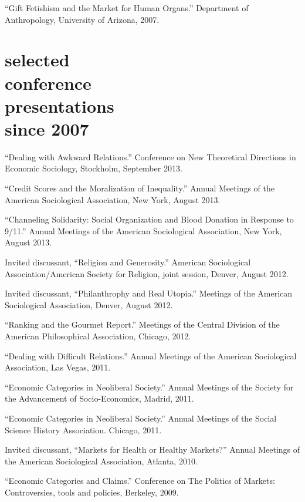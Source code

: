 \documentclass[11pt,oneside,a4paper,DIV=8]{scrartcl}
\begin{document}
``Gift Fetishism and the Market for Human Organs.'' Department of Anthropology, University of Arizona, 2007. 





\section{selected \\ conference \\ presentations \\ since 2007}


``Dealing with Awkward Relations.'' Conference on New Theoretical Directions in Economic Sociology, Stockholm, September 2013. 

``Credit Scores and the Moralization of Inequality.'' Annual Meetings of the American Sociological Association, New York, August 2013.
 
``Channeling Solidarity: Social Organization and Blood Donation in Response to 9/11.'' Annual Meetings of the American Sociological Association, New York, August 2013.

Invited discussant, ``Religion and Generosity.'' American Sociological Association/American Society for Religion, joint session, Denver, August 2012.

Invited discussant, ``Philanthrophy and Real Utopia.'' Meetings of the American Sociological Association, Denver, August 2012. 

``Ranking and the Gourmet Report.'' Meetings of the Central Division of the American Philosophical Association, Chicago, 2012. 

``Dealing with Difficult Relations.'' Annual Meetings of the American Sociological Association, Las Vegas, 2011.

``Economic Categories in Neoliberal Society.'' Annual Meetings of the Society for the Advancement of Socio-Economics, Madrid, 2011.

``Economic Categories in Neoliberal Society.'' Annual Meetings of the Social Science History Association. Chicago, 2011. 

Invited discussant, ``Markets for Health or Healthy Markets?'' Annual Meetings of the American Sociological Association, Atlanta, 2010. 

``Economic Categories and Claims.'' Conference on The Politics of Markets: Controversies, tools and policies, Berkeley, 2009.
\end{document}
